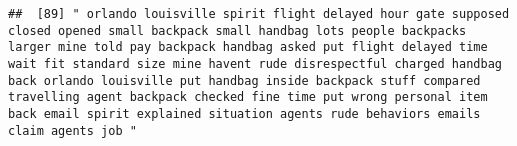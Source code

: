 \documentclass[
]{article}
\begin{document}
\begin{verbatim}
##  [89] " orlando louisville spirit flight delayed hour gate supposed closed opened small backpack small handbag lots people backpacks larger mine told pay backpack handbag asked put flight delayed time wait fit standard size mine havent rude disrespectful charged handbag back orlando louisville put handbag inside backpack stuff compared travelling agent backpack checked fine time put wrong personal item back email spirit explained situation agents rude behaviors emails claim agents job "                                                                                                                                                                                                                                                                                                                                                                                                                                                                                                                                                                                                                                                                                                                                                                                                                                                                                                                                                                                                                                                                                                                                                                                                                                                                                           

\end{verbatim}
\end{document}
